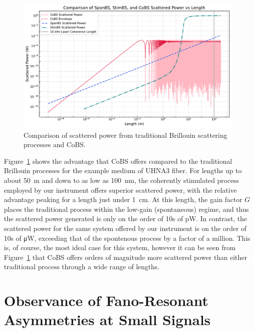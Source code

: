 \begin{figure}[ht]
\centering
\includegraphics[width=\textwidth]{figs/3-CoBS/SponBSvsStimBSvsCoBS.pdf}
\caption{Comparison of scattered power from traditional Brillouin scattering processes and \acs{CoBS}.}
\label{fig:SponBSvsStimBSvsCoBS}
\end{figure}

Figure~\ref{fig:SponBSvsStimBSvsCoBS} shows the advantage that \acs{CoBS} offers compared to the traditional Brillouin processes for the example medium of \ac{UHNA3} fiber. For lengths up to about \SI{50}{\meter} and down to as low as \SI{100}{\nano\meter}, the coherently stimulated process employed by our instrument offers superior scattered power, with the relative advantage peaking for a length just under \SI{1}{\centi\meter}. At this length, the gain factor \(G\) places the traditional process within the low-gain (spontaneous) regime, and thus the scattered power generated is only on the order of 10s of \si{\pico\watt}. In contrast, the scattered power for the same system offered by our instrument is on the order of 10s of \si{\micro\watt}, exceeding that of the spontenous process by a factor of a million. This is, of course, the most ideal case for this system, however it can be seen from Figure~\ref{fig:SponBSvsStimBSvsCoBS} that \acs{CoBS} offers orders of magnitude more scattered power than either traditional process through a wide range of lengths.

\newpage


\section{Observance of Fano-Resonant Asymmetries at Small Signals}
\label{Appendix:Fano}

